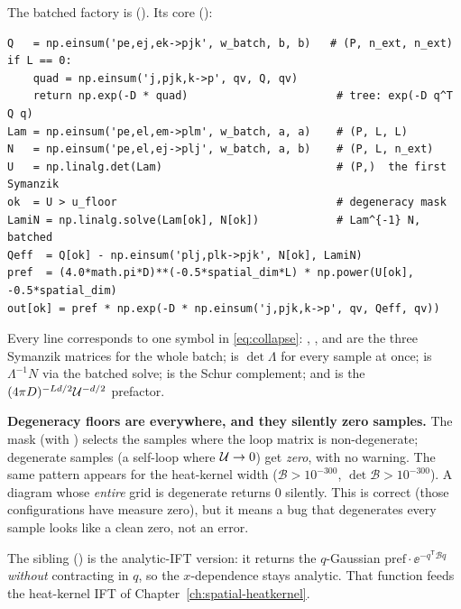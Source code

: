 The batched factory is 
(). Its core ():

\begin{lstlisting}
Q   = np.einsum('pe,ej,ek->pjk', w_batch, b, b)   # (P, n_ext, n_ext)
if L == 0:
    quad = np.einsum('j,pjk,k->p', qv, Q, qv)
    return np.exp(-D * quad)                       # tree: exp(-D q^T Q q)
Lam = np.einsum('pe,el,em->plm', w_batch, a, a)    # (P, L, L)
N   = np.einsum('pe,el,ej->plj', w_batch, a, b)    # (P, L, n_ext)
U   = np.linalg.det(Lam)                           # (P,)  the first Symanzik
ok  = U > u_floor                                  # degeneracy mask
LamiN = np.linalg.solve(Lam[ok], N[ok])            # Lam^{-1} N, batched
Qeff  = Q[ok] - np.einsum('plj,plk->pjk', N[ok], LamiN)
pref  = (4.0*math.pi*D)**(-0.5*spatial_dim*L) * np.power(U[ok], -0.5*spatial_dim)
out[ok] = pref * np.exp(-D * np.einsum('j,pjk,k->p', qv, Qeff, qv))
\end{lstlisting}

Every line corresponds to one symbol in \eqref{eq:collapse}: , ,
and  are the three Symanzik matrices for the whole batch;  is
$\det\Lambda$ for every sample at once;  is $\Lambda^{-1}N$ via the
batched solve;  is the Schur complement; and  is the
$(4\pi D)^{-Ld/2}\mathcal{U}^{-d/2}$ prefactor.

\begin{gotcha}
\textbf{Degeneracy floors are everywhere, and they silently zero samples.} The
mask  (with ) selects the samples
where the loop matrix is non-degenerate; degenerate samples (a self-loop where
$\mathcal{U}\to0$) get \emph{zero}, with no warning. The same pattern appears for the
heat-kernel width ($\mathcal{B} > 10^{-300}$, $\det\mathcal{B} > 10^{-300}$). A
diagram whose \emph{entire} grid is degenerate returns $0$ silently. This is
correct (those configurations have measure zero), but it means a bug that
degenerates every sample looks like a clean zero, not an error.
\end{gotcha}

The sibling  () is the
analytic-IFT version: it returns the $q$-Gaussian
$\text{pref}\cdot\ee^{-q^{\mathsf T}\mathcal{B}q}$ \emph{without} contracting in $q$,
so the $x$-dependence stays analytic. That function feeds the heat-kernel IFT of
Chapter~\ref{ch:spatial-heatkernel}.

